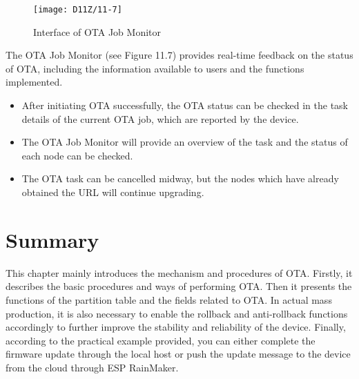 \documentclass[a4paper,12pt]{book}
\begin{document}
\begin{figure}[h!]
    \centering
    \texttt{[image: D11Z/11-7]}
    \caption{ Interface of OTA Job Monitor}
\end{figure}

The OTA Job Monitor (see Figure 11.7) provides real-time feedback on the status of OTA, including the information available to users and the functions implemented.

\begin{itemize}
    \item After initiating OTA successfully, the OTA status can be checked in the task details of the current OTA job, which are reported by the device.
    \item The OTA Job Monitor will provide an overview of the task and the status of each node can be checked.
    \item The OTA task can be cancelled midway, but the nodes which have already obtained the URL will continue upgrading.
\end{itemize}

\section{Summary}
This chapter mainly introduces the mechanism and procedures of OTA. Firstly, it describes the basic procedures and ways of performing OTA. Then it presents the functions of the partition table and the fields related to OTA. In actual mass production, it is also necessary to enable the rollback and anti-rollback functions accordingly to further improve the stability and reliability of the device. Finally, according to the practical example provided, you can either complete the firmware update through the local host or push the update message to the device from the cloud through ESP RainMaker.
\end{document}

